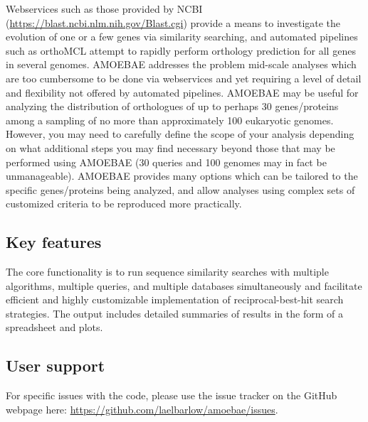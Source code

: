 \documentclass[12pt,letterpaper]{article}
\begin{document}
\begin{linenumbers}
    Webservices such as those provided by NCBI
    (\url{https://blast.ncbi.nlm.nih.gov/Blast.cgi}) \citep{camacho2009}
    provide a means to investigate the evolution of one or a few genes via
    similarity searching, and automated pipelines such as orthoMCL
    \citep{li2003} attempt to rapidly perform orthology prediction for all
    genes in several genomes. AMOEBAE addresses the problem mid-scale analyses
    which are too cumbersome to be done via webservices and yet requiring a
    level of detail and flexibility not offered by automated pipelines. AMOEBAE
    may be useful for analyzing the distribution of orthologues of up to
    perhaps 30 genes/proteins among a sampling of no more than approximately
    100 eukaryotic genomes.  However, you may need to carefully define the
    scope of your analysis depending on what additional steps you may find
    necessary beyond those that may be performed using AMOEBAE (30 queries and
    100 genomes may in fact be unmanageable). AMOEBAE provides many options
    which can be tailored to the specific genes/proteins being analyzed, and
    allow analyses using complex sets of customized criteria to be reproduced
    more practically. 


\subsection{Key features}


The core functionality is to run sequence similarity searches with multiple
    algorithms, multiple queries, and multiple databases simultaneously and
    facilitate efficient and highly customizable implementation of
    reciprocal-best-hit search strategies. The output includes detailed
    summaries of results in the form of a spreadsheet and plots.

\subsection{User support}

For specific issues with the code, please use the issue tracker on the GitHub
    webpage here: \url{https://github.com/laelbarlow/amoebae/issues}. 


\end{linenumbers}
\end{document}
